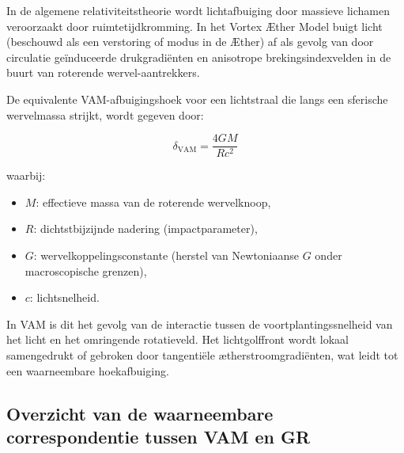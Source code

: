 In de algemene relativiteitstheorie wordt lichtafbuiging door massieve lichamen veroorzaakt door ruimtetijdkromming. In het Vortex Æther Model buigt licht (beschouwd als een verstoring of modus in de Æther) af als gevolg van door circulatie geïnduceerde drukgradiënten en anisotrope brekingsindexvelden in de buurt van roterende wervel-aantrekkers.

De equivalente VAM-afbuigingshoek voor een lichtstraal die langs een sferische wervelmassa strijkt, wordt gegeven door:

\begin{equation}
    \delta_\text{VAM} =
    \frac{4 G M}{R c^2}
\end{equation}

waarbij:
\begin{itemize}
    \item \( M \): effectieve massa van de roterende wervelknoop,
    \item \( R \): dichtstbijzijnde nadering (impactparameter),
    \item \( G \): wervelkoppelingsconstante (herstel van Newtoniaanse \( G \) onder macroscopische grenzen),
    \item \( c \): lichtsnelheid.
\end{itemize}

In VAM is dit het gevolg van de interactie tussen de voortplantingssnelheid van het licht en het omringende rotatieveld. Het lichtgolffront wordt lokaal samengedrukt of gebroken door tangentiële ætherstroomgradiënten, wat leidt tot een waarneembare hoekafbuiging.

\subsection*{Overzicht van de waarneembare correspondentie tussen VAM en GR}

